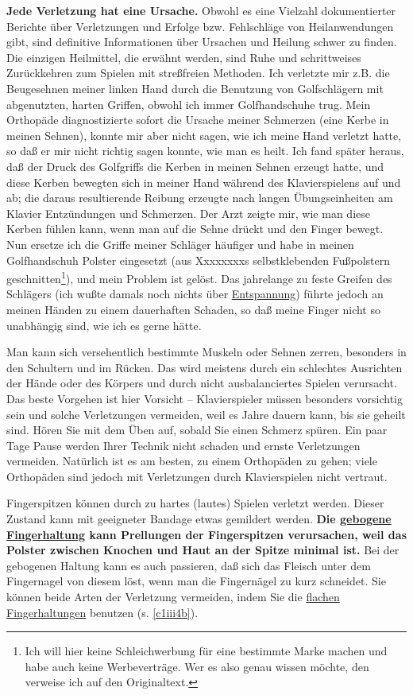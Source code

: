 \textbf{Jede Verletzung hat eine Ursache.}
Obwohl es eine Vielzahl dokumentierter Berichte über Verletzungen und Erfolge bzw. Fehlschläge von Heilanwendungen gibt, sind definitive Informationen über Ursachen und Heilung schwer zu finden.
Die einzigen Heilmittel, die erwähnt werden, sind Ruhe und schrittweises Zurückkehren zum Spielen mit streßfreien Methoden.
Ich verletzte mir z.B. die Beugesehnen meiner linken Hand durch die Benutzung von Golfschlägern mit abgenutzten, harten Griffen, obwohl ich immer Golfhandschuhe trug.
Mein Orthopäde diagnostizierte sofort die Ursache meiner Schmerzen (eine Kerbe in meinen Sehnen), konnte mir aber nicht sagen, wie ich meine Hand verletzt hatte, so daß er mir nicht richtig sagen konnte, wie man es heilt.
Ich fand später heraus, daß der Druck des Golfgriffs die Kerben in meinen Sehnen erzeugt hatte, und diese Kerben bewegten sich in meiner Hand während des Klavierspielens auf und ab; die daraus resultierende Reibung erzeugte nach langen Übungseinheiten am Klavier Entzündungen und Schmerzen.
Der Arzt zeigte mir, wie man diese Kerben fühlen kann, wenn man auf die Sehne drückt und den Finger bewegt.
Nun ersetze ich die Griffe meiner Schläger häufiger und habe in meinen Golfhandschuh Polster eingesetzt (aus Xxxxxxxxs selbstklebenden Fußpolstern geschnitten\footnote{Ich will hier keine Schleichwerbung für eine bestimmte Marke machen und habe auch keine Werbeverträge. Wer es also genau wissen möchte, den verweise ich auf den Originaltext.}), und mein Problem ist gelöst.
Das jahrelange zu feste Greifen des Schlägers (ich wußte damals noch nichts über \hyperref[c1ii14]{Entspannung}) führte jedoch an meinen Händen zu einem dauerhaften Schaden, so daß meine Finger nicht so unabhängig sind, wie ich es gerne hätte.

Man kann sich versehentlich bestimmte Muskeln oder Sehnen zerren, besonders in den Schultern und im Rücken.
Das wird meistens durch ein schlechtes Ausrichten der Hände oder des Körpers und durch nicht ausbalanciertes Spielen verursacht.
Das beste Vorgehen ist hier Vorsicht -- Klavierspieler müssen besonders vorsichtig sein und solche Verletzungen vermeiden, weil es Jahre dauern kann, bis sie geheilt sind.
Hören Sie mit dem Üben auf, sobald Sie einen Schmerz spüren.
Ein paar Tage Pause werden Ihrer Technik nicht schaden und ernste Verletzungen vermeiden.
Natürlich ist es am besten, zu einem Orthopäden zu gehen; viele Orthopäden sind jedoch mit Verletzungen durch Klavierspielen nicht vertraut.

Fingerspitzen können durch zu hartes (lautes) Spielen verletzt werden.
Dieser Zustand kann mit geeigneter Bandage etwas gemildert werden.
\textbf{Die \hyperref[c1ii2]{gebogene Fingerhaltung} kann Prellungen der Fingerspitzen verursachen, weil das Polster zwischen Knochen und Haut an der Spitze minimal ist.}
Bei der gebogenen Haltung kann es auch passieren, daß sich das Fleisch unter dem Fingernagel von diesem löst, wenn man die Fingernägel zu kurz schneidet.
Sie können beide Arten der Verletzung vermeiden, indem Sie die \hyperref[c1iii4b]{flachen Fingerhaltungen} benutzen (s. \autoref{c1iii4b}).


